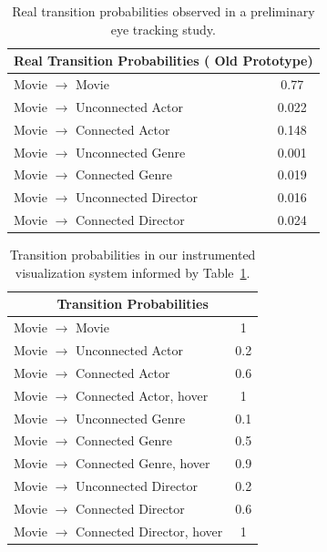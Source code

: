 


\begin{table}[htbp]
	\centering
		\begin{tabular}{|l|c|}
			\hline
			 \multicolumn{2}{|c|}{Real Transition Probabilities ( Old Prototype)} \\ \hline
			Movie $\rightarrow$ Movie & 0.77\\\hline
			Movie $\rightarrow$ Unconnected Actor & 0.022\\\hline
			Movie $\rightarrow$ Connected Actor & 0.148\\\hline
			Movie $\rightarrow$ Unconnected Genre & 0.001\\\hline
			Movie $\rightarrow$ Connected Genre & 0.019\\\hline
			Movie $\rightarrow$ Unconnected Director & 0.016\\\hline
			Movie $\rightarrow$ Connected Director & 0.024\\
			\hline			
		\end{tabular}
	\caption{Real transition probabilities observed in a preliminary eye tracking study.}
	\label{tab:Transition1}
\end{table}

\begin{table}[htbp]
	\centering
		\begin{tabular}{|l|c|}
			\hline
			 \multicolumn{2}{|c|}{Transition Probabilities} \\ \hline
			Movie $\rightarrow$ Movie & 1\\\hline
			Movie $\rightarrow$ Unconnected Actor & 0.2\\\hline
			Movie $\rightarrow$ Connected Actor & 0.6\\\hline
			Movie $\rightarrow$ Connected Actor, hover & 1\\\hline
			Movie $\rightarrow$ Unconnected Genre & 0.1\\\hline
			Movie $\rightarrow$ Connected Genre & 0.5\\\hline
			Movie $\rightarrow$ Connected Genre, hover & 0.9\\\hline
			Movie $\rightarrow$ Unconnected Director & 0.2\\\hline
			Movie $\rightarrow$ Connected Director & 0.6\\\hline
			Movie $\rightarrow$ Connected Director, hover & 1\\
			\hline			
		\end{tabular}
	\caption{Transition probabilities in our instrumented visualization system informed by Table~\ref{tab:Transition1}.}
	\label{tab:Transition2}
\end{table}

